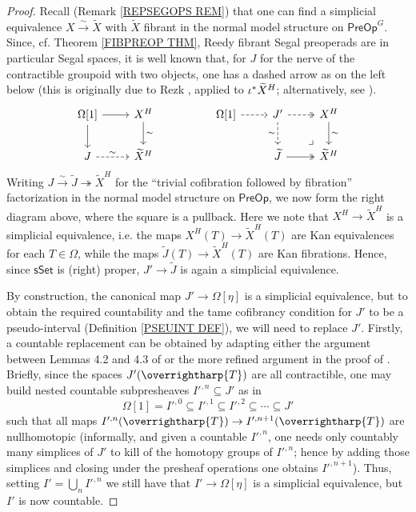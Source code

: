 \documentclass[a4paper,10pt
,draft
]{article}%
\numberwithin{equation}{section}
\numberwithin{figure}{section}
\theoremstyle{definition} %
\newcommand{\vect}[1]{\text{\overrightharp{\ensuremath{#1}}}}
\newcommand{\1}{\ensuremath{\mathbbm 1}}%
\begin{document}
\begin{proof}
	Recall (Remark \ref{REPSEGOPS REM})
	that one can find a simplicial equivalence
	$X \xrightarrow{\sim} \widetilde{X}$
	with $\widetilde{X}$ fibrant in the normal model structure on 
	$\mathsf{PreOp}^G$.
	Since, cf. Theorem \ref{FIBPREOP THM},
	Reedy fibrant Segal preoperads are in particular
	Segal spaces, 
	it is well known that,
	for $J$ for the nerve of the contractible groupoid
	with two objects,
	one has a dashed arrow as on the left below
	(this is originally due to 
	Rezk \cite[Thm. 6.2]{Rez01},
	applied to $\iota^{\**} \widetilde{X}^H$; 
	alternatively, see \cite[Prop. 5.26(iv)]{BP_edss}).
\[
\begin{tikzcd}
	\Omega[1] \ar{r} \ar{d} 
&
	X^H \ar{d}{\sim}
&&
	\Omega[1] \ar[dashed]{r}
&
	J' \ar[dashed,twoheadrightarrow]{r} \ar[dashed]{d}[swap]{\sim} 
&
	X^H \ar{d}{\sim}
\\
	J \ar[dashed]{r}{\sim}
&
	\widetilde{X}^H
&&&
	\widetilde{J} \ar[twoheadrightarrow]{r}
&
	\widetilde{X}^H
	\arrow[lu, phantom, "\lrcorner", very near start]
\end{tikzcd}
\]	
Writing 
$J \xrightarrow{\sim} 
\widetilde{J} \twoheadrightarrow 
\widetilde{X}^H$
for the ``trivial cofibration followed by fibration''
factorization in the normal model structure
on $\mathsf{PreOp}$,
we now form the right diagram above, 
where the square is a pullback.
Here we note that
$X^H \to \widetilde{X}^H$
is a simplicial equivalence,
i.e. the maps
$X^H(T) \to \widetilde{X}^H(T)$
are Kan equivalences for each $T \in \Omega$,
while the maps 
$\widetilde{J}(T) \to \widetilde{X}^H(T)$
are Kan fibrations.
Hence, 
since $\mathsf{sSet}$ is (right) proper, 
$J' \to \widetilde{J}$ is again a simplicial equivalence.

By construction, the canonical map 
$J' \to \Omega[\eta]$
is a simplicial equivalence, 
but to obtain the required 
countability and the tame cofibrancy condition
for $J'$ to be a pseudo-interval 
(Definition \ref{PSEUINT DEF}),
we will need to replace $J'$.
Firstly, a countable replacement can be obtained by adapting
either the argument
between Lemmas 4.2 and 4.3 of
\cite{Ber07}
or the more refined argument in the proof of 
\cite[Lemma 5.1.7]{HSS}.
Briefly, since the spaces $J'(\vect{T})$
are all contractible,
one may build nested
countable subpresheaves
$I'^{,n} \subseteq J'$ as in
\[
\Omega[1] = 
I'^{,0} \subseteq
I'^{,1} \subseteq
I'^{,2} \subseteq
\cdots \subseteq
J'
\]
such that all maps 
$I'^{,n}(\vect{T}) \to I'^{,n+1}(\vect{T})$
are nullhomotopic
(informally, and given a countable $I'^{,n}$, 
one needs only countably many simplices of $J'$
to kill of the homotopy groups of $I'^{,n}$; 
hence by adding those simplices and closing under the presheaf operations one obtains $I'^{,n+1}$).
Thus, setting $I' = \bigcup_{n} I'^{,n}$
we still have that $I' \to \Omega[\eta]$
is a simplicial equivalence, 
but $I'$ is now countable.


\end{proof}
\end{document}
